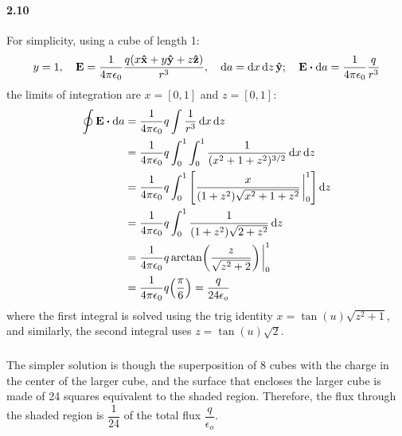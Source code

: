 \documentclass[../main.tex]{subfiles}
\begin{document}
\paragraph{2.10}
For simplicity, using a cube of length 1:
\begin{align*}
    y = 1 ,\quad \vb{E} = \ke \frac{q(x\vu{x} + y\vu{y} + z\vu{z})}{r^3}
    ,\quad \dd{a} = \dd{x} \dd{z} \vu{y} ;\quad \vb{E} \vdot \dd{a} = \ke \frac{q}{r^3}
\end{align*}
the limits of integration are $x = [0,1]$ and $z = [0,1]$:
\begin{align*}
    \oint \vb{E} \vdot \dd{a} &=\ke q \int \frac{1}{r^3} \dd{x} \dd{z} \\
    &= \ke q \int_0^1 \int_0^1 \frac{1}{(x^2 + 1 + z^2)^{3/2}} \dd{x} \dd{z} \\
    &= \ke q \int_0^1 \qt[
        \frac{x}{(1+z^2) \sqrt{x^2 + 1 + z^2}} \eval_0^1 
    ] \dd{z} \\
    &= \ke q \int_0^1 \frac{1}{(1 + z^2) \sqrt{2 + z^2}} \dd{z} \\
    &= \ke q \arctan(\frac{z}{\sqrt{z^2 + 2}}) \eval_0^1 \\
    &= \ke q \qt(\frac{\pi}{6}) = \frac{q}{24\epsilon_o}
\end{align*}
where the first integral is solved using the trig identity $x = \tan(u) \sqrt{z^2 + 1}$, and 
similarly, the second integral uses $z = \tan(u) \sqrt{2}$.

\subparagraph*{}
The simpler solution is though the superposition of 8 cubes with the charge in the center of the
larger cube, and the surface that encloses the larger cube is made of 24 squares equivalent to the
shaded region. Therefore, the flux through the shaded region is $\dfrac{1}{24}$ of the total flux 
$\dfrac{q}{\epsilon_o}$.
\end{document}
